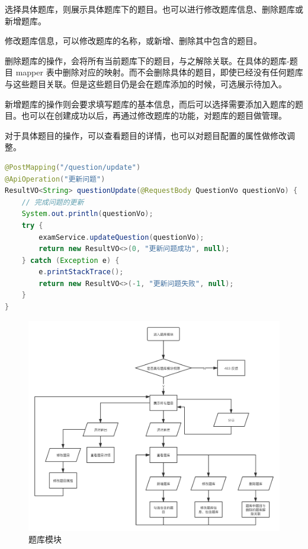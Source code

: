 选择具体题库，则展示具体题库下的题目。也可以进行修改题库信息、删除题库或新增题库。

修改题库信息，可以修改题库的名称，或新增、删除其中包含的题目。

删除题库的操作，会将所有当前题库下的题目，与之解除关联。在具体的题库-题目 mapper 表中删除对应的映射。而不会删除具体的题目，即使已经没有任何题库与这些题目关联。但是这些题目仍是会在题库添加的时候，可选展示待加入。

新增题库的操作则会要求填写题库的基本信息，而后可以选择需要添加入题库的题目。也可以在创建成功以后，再通过修改题库的功能，对题库的题目做管理。

对于具体题目的操作，可以查看题目的详情，也可以对题目配置的属性做修改调整。

\begin{lstlisting}[language=Java]
@PostMapping("/question/update")
@ApiOperation("更新问题")
ResultVO<String> questionUpdate(@RequestBody QuestionVo questionVo) {
    // 完成问题的更新
    System.out.println(questionVo);
    try {
        examService.updateQuestion(questionVo);
        return new ResultVO<>(0, "更新问题成功", null);
    } catch (Exception e) {
        e.printStackTrace();
        return new ResultVO<>(-1, "更新问题失败", null);
    }
}
\end{lstlisting}

\begin{figure}[htb]
    \centering
    \includegraphics[width=\linewidth]{_images/题库模块.png}
    \caption{题库模块}
\end{figure}


